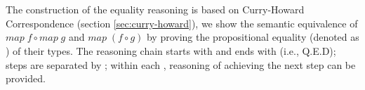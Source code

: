 \documentclass{l4proj}
\begin{document}
\begin{code}
\AgdaSpace{}%
\AgdaSpace{}%
\AgdaSpace{}%
\AgdaSymbol{)}\<%
\\
%
\>[2]\<%
\\
\>[2][@{}l@{\AgdaIndent{0}}]%
\>[4]\AgdaSpace{}%
\AgdaSymbol{(}\AgdaSpace{}%
\AgdaSymbol{)}\AgdaSpace{}%
\AgdaSpace{}%
\AgdaSpace{}%
\AgdaSpace{}%
\AgdaSymbol{(}\AgdaSpace{}%
\AgdaSpace{}%
\AgdaSymbol{)}\<%
\\
%
\>[2]\<%
\\
\>[2][@{}l@{\AgdaIndent{0}}]%
\>[4]\AgdaSymbol{(}\AgdaSpace{}%
\AgdaSpace{}%
\AgdaSymbol{)}\AgdaSpace{}%
\AgdaSpace{}%
\AgdaSpace{}%
\AgdaSpace{}%
\AgdaSpace{}%
\AgdaSymbol{(}\AgdaSpace{}%
\AgdaSpace{}%
\AgdaSymbol{)}\<%
\\
%
\>[2]\AgdaSpace{}%
\AgdaSpace{}%
\AgdaSymbol{((}\AgdaSpace{}%
\AgdaSpace{}%
\AgdaSymbol{)}\AgdaSpace{}%
\AgdaSpace{}%
\AgdaSpace{}%
\AgdaSymbol{)}\AgdaSpace{}%
\AgdaSymbol{(}\AgdaSpace{}%
\AgdaSpace{}%
\AgdaSpace{}%
\AgdaSymbol{)}\AgdaSpace{}%
\<%
\\
\>[2][@{}l@{\AgdaIndent{0}}]%
\>[4]\AgdaSymbol{(}\AgdaSpace{}%
\AgdaSpace{}%
\AgdaSymbol{)}\AgdaSpace{}%
\AgdaSpace{}%
\AgdaSpace{}%
\AgdaSpace{}%
\AgdaSymbol{(}\AgdaSpace{}%
\AgdaSpace{}%
\AgdaSymbol{)}\AgdaSpace{}%
\<%
\\
%
\>[2]\<%
\end{code}
The construction of the equality reasoning is based on Curry-Howard Correspondence (section \ref{sec:curry-howard}), we show the semantic equivalence of $map\; f \circ map\; g$ and $map\; (f \circ g)$ by proving the propositional equality (denoted as ) of their types. The reasoning chain starts with  and ends with  (i.e., Q.E.D); steps are separated by ; within each , reasoning of achieving the next step can be provided.
\end{document}
